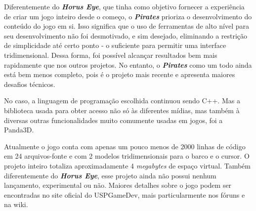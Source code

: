 \documentclass[12pt,onecolumn,a4paper]{article}
\begin{document}
        Diferentemente do \textit{\textbf{Horus Eye}}, que tinha como objetivo fornecer a
        experiência de criar um jogo inteiro desde o começo, o \textit{\textbf{Pirates}} prioriza
        o desenvolvimento do conteúdo do jogo em si. Isso significa que o uso de ferramentas de alto
        nível para seu desenvolvimento não foi desmotivado, e sim desejado, eliminando a restrição
        de simplicidade até certo ponto - o suficiente para permitir uma interface tridimensional.
        Dessa forma, foi possível alcançar resultados bem mais rapidamente que nos outros projetos.
        No entanto, o \textit{\textbf{Pirates}} como um todo ainda está bem menos completo, pois é o
        projeto mais recente e apresenta maiores desafios técnicos.
        
        No caso, a linguagem de programação escolhida continuou sendo C++. Mas a biblioteca usada
        para obter acesso não só às diferentes mídias, mas também à diversas outras funcionalidades
        muito comumente usadas em jogos, foi a Panda3D\footnotemark.
        
        Atualmente o jogo conta com apenas um pouco menos de 2000 linhas de código em 24
        arquivos-fonte e com 2 modelos tridimensionais para o barco e o cursor. O projeto
        inteiro totaliza aproximadamente 4 \textit{megabytes} de espaço virtual. Também
        diferentemente do \textit{\textbf{Horus Eye}}, esse projeto ainda não possui nenhum
        lançamento, experimental ou não. Maiores detalhes sobre o jogo podem ser encontradas no site
        oficial do USPGameDev, mais particularmente nos fóruns e na wiki.



    
\end{document}
